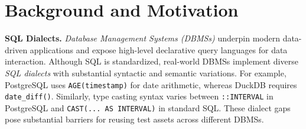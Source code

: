 \documentclass[sigconf,review,anonymous]{acmart}
\begin{document}
\section{Background and Motivation}
\label{sec:background}
\textbf{SQL Dialects.} 
\textit{Database Management Systems (DBMSs)} underpin modern data-driven applications and expose high-level declarative query languages for data interaction. Although SQL is standardized, real-world DBMSs implement diverse \textit{SQL dialects} with substantial syntactic and semantic variations.
For example, PostgreSQL uses \texttt{AGE(timestamp)} for date arithmetic, whereas DuckDB requires \texttt{date\_diff()}. Similarly, type casting syntax varies between \texttt{::INTERVAL} in PostgreSQL and \texttt{CAST(... AS INTERVAL)} in standard SQL. 
These dialect gaps pose substantial barriers for reusing test assets across different DBMSs.






\end{document}
